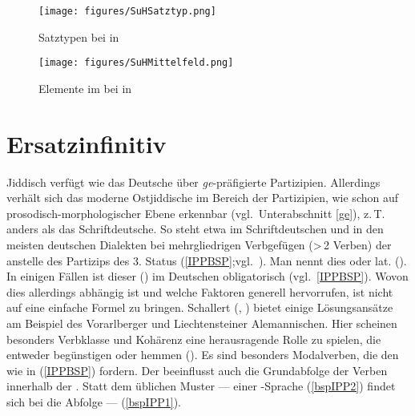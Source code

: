 
\begin{figure}
\centering
\texttt{[image: figures/SuHSatztyp.png]}
	\caption{Satztypen bei  in }\label{SatztypfigurenSH}	
	\end{figure}




\begin{figure}
\centering
\texttt{[image: figures/SuHMittelfeld.png]}
	\caption{Elemente im \hai{{\MF}} bei  in }\label{MFfigurenSH}	
	\end{figure}


   
  \section{Ersatzinfinitiv}\label{noipp}
 Jiddisch verfügt wie das Deutsche über \textit{ge}-präfigierte Partizipien. Allerdings verhält sich das moderne Ostjiddische im Bereich der Partizipien, wie schon auf prosodisch-morphologischer Ebene erkennbar (vgl.\, Unterabschnitt \ref{ge}), z.\,T. anders als das Schriftdeutsche. So steht etwa im Schriftdeutschen und in den meisten deutschen Dialekten bei mehrgliedrigen  Verbgefügen (>\,2 Verben) der  anstelle des Partizips des 3. Status (\ref{IPPBSP};vgl.\, \citealt{Vikner2001,Schallert2014,Schmidt2002,Schmidt2005}). Man nennt dies  oder lat.  (\hai{{\IPP}}). In einigen Fällen ist dieser  (\citealt{Schallert2014}) im Deutschen obligatorisch (vgl.\, \ref{IPPBSP}). Wovon dies allerdings abhängig ist und welche Faktoren generell \hai{{\IPP}} hervorrufen, ist nicht auf eine einfache Formel zu bringen. Schallert (\citeyear{Schallert2012},  \citeyear{Schallert2014}) bietet einige Lösungsansätze am Beispiel des Vorarlberger und Liechtensteiner Alemannischen. Hier scheinen besonders Verbklasse und Kohärenz eine herausragende Rolle zu spielen, die \hai{{\IPP}} entweder begünstigen oder hemmen (\citealt[298–302]{Schallert2012}). Es sind besonders Modalverben, die den  wie in (\ref{IPPBSP}) fordern. Der  beeinflusst auch die Grundabfolge der Verben innerhalb der \hai{{\RSK}}. Statt dem üblichen Muster –– einer \hai{{\OV}}-Sprache (\ref{bspIPP2}) findet sich bei \hai{{\IPP}} die Abfolge –– (\ref{bspIPP1}). 

